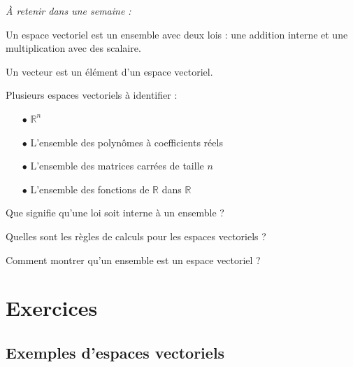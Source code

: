 
\begin{resumeBox}
  \emph{À retenir dans une semaine :} 
  \begin{niceitemize}
    \item Un espace vectoriel est un ensemble avec deux lois : une addition interne et une multiplication avec des scalaire.
    \item Un vecteur est un élément d'un espace vectoriel.
    \item Plusieurs espaces vectoriels à identifier :
      \begin{itemize}
        \item[$\bullet$] $\mathbb{R}^n$
        \item[$\bullet$] L'ensemble des polynômes à coefficients réels
        \item[$\bullet$] L'ensemble des matrices carrées de taille $n$
        \item[$\bullet$] L'ensemble des fonctions de $\mathbb{R}$ dans $\mathbb{R}$
      \end{itemize}
  \end{niceitemize}
\end{resumeBox}
\begin{rappelsBox}
  \begin{niceitemize}
    \item Que signifie qu'une loi soit interne à un ensemble ?
    \item Quelles sont les règles de calculs pour les espaces vectoriels ?
    \item Comment montrer qu'un ensemble est un espace vectoriel ?
  \end{niceitemize}
\end{rappelsBox}

\section{Exercices}
  \subsection{Exemples d'espaces vectoriels}

